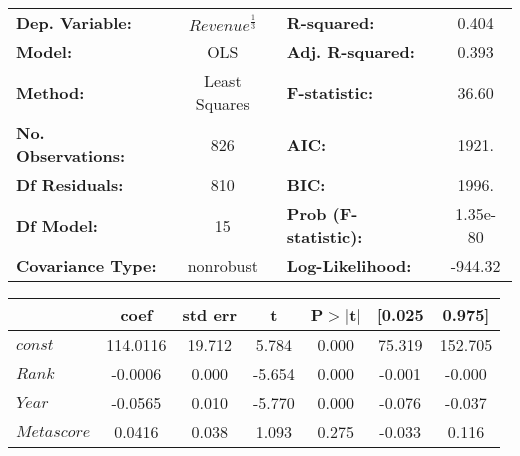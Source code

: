         \begin{table}[H]
            \begin{center}
                \begin{tabular}{lclc}
                    \toprule
                    \textbf{Dep. Variable:}           &  $Revenue^{\frac{1}{3}}$   & \textbf{  R-squared:         } &     0.404   \\
                    \textbf{Model:}                   &       OLS        & \textbf{  Adj. R-squared:    } &     0.393   \\
                    \textbf{Method:}                  &  Least Squares   & \textbf{  F-statistic:       } &     36.60   \\
                    \textbf{No. Observations:}        &         826      & \textbf{  AIC:               } &     1921.   \\
                    \textbf{Df Residuals:}            &         810      & \textbf{  BIC:               } &     1996.   \\
                    \textbf{Df Model:}                &          15      & \textbf{  Prob (F-statistic):} &  1.35e-80   \\
                    \textbf{Covariance Type:}         &    nonrobust     & \textbf{  Log-Likelihood:    } &   -944.32   \\
                    \bottomrule
                \end{tabular}
                \begin{tabular}{lcccccc}
                                                    & \textbf{coef} & \textbf{std err} & \textbf{t} & \textbf{P$> |$t$|$} & \textbf{[0.025} & \textbf{0.975]}  \\
                    \midrule
                    \textbf{$const$}                &     114.0116  &       19.712     &     5.784  &         0.000        &       75.319    &      152.705     \\
                    \textbf{$Rank$}                 &      -0.0006  &        0.000     &    -5.654  &         0.000        &       -0.001    &       -0.000     \\
                    \textbf{$Year$}                 &      -0.0565  &        0.010     &    -5.770  &         0.000        &       -0.076    &       -0.037     \\
                    \textbf{$Metascore$}            &       0.0416  &        0.038     &     1.093  &         0.275        &       -0.033    &        0.116     \\

\end{tabular}
\end{center}
\end{table}
